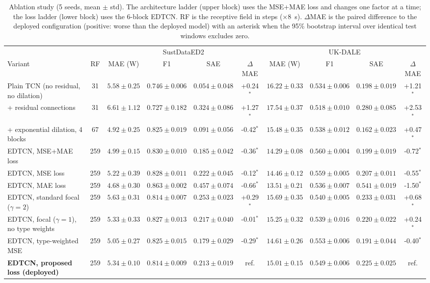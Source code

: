 \documentclass[fleqn,10pt]{wlscirep}
\begin{document}
\begin{table}[!t]
\centering
\caption{Ablation study (5 seeds, mean $\pm$ std). The architecture ladder (upper block) uses the MSE+MAE loss and changes one factor at a time; the loss ladder (lower block) uses the 6-block EDTCN. RF is the receptive field in steps ($\times$8~s). $\Delta$MAE is the paired difference to the deployed configuration (positive: worse than the deployed model) with an asterisk when the 95\% bootstrap interval over identical test windows excludes zero.}
\label{tab:ablation}
\footnotesize
\begin{adjustbox}{max width=\textwidth}\begin{tabular}{@{}lc cccc cccc@{}}
\toprule
 & & \multicolumn{4}{c}{SustDataED2} & \multicolumn{4}{c}{UK-DALE} \\
\cmidrule(lr){3-6}\cmidrule(lr){7-10}
Variant & RF & MAE (W) & F1 & SAE & $\Delta$MAE & MAE (W) & F1 & SAE & $\Delta$MAE \\
\midrule
Plain TCN (no residual, no dilation) & 31 & $5.58\pm0.25$ & $0.746\pm0.006$ & $0.054\pm0.048$ & +0.24$^{*}$ & $16.22\pm0.33$ & $0.534\pm0.006$ & $0.198\pm0.019$ & +1.21$^{*}$ \\
+ residual connections & 31 & $6.61\pm1.12$ & $0.727\pm0.182$ & $0.324\pm0.086$ & +1.27$^{*}$ & $17.54\pm0.37$ & $0.518\pm0.010$ & $0.280\pm0.085$ & +2.53$^{*}$ \\
+ exponential dilation, 4 blocks & 67 & $4.92\pm0.25$ & $0.825\pm0.019$ & $0.091\pm0.056$ & -0.42$^{*}$ & $15.48\pm0.35$ & $0.538\pm0.012$ & $0.162\pm0.023$ & +0.47$^{*}$ \\
\midrule
EDTCN, MSE+MAE loss & 259 & $4.99\pm0.15$ & $0.830\pm0.010$ & $0.185\pm0.042$ & -0.36$^{*}$ & $14.29\pm0.08$ & $0.560\pm0.004$ & $0.199\pm0.019$ & -0.72$^{*}$ \\
EDTCN, MSE loss & 259 & $5.22\pm0.39$ & $0.828\pm0.011$ & $0.222\pm0.045$ & -0.12$^{*}$ & $14.46\pm0.12$ & $0.559\pm0.005$ & $0.207\pm0.011$ & -0.55$^{*}$ \\
EDTCN, MAE loss & 259 & $4.68\pm0.30$ & $0.863\pm0.002$ & $0.457\pm0.074$ & -0.66$^{*}$ & $13.51\pm0.21$ & $0.536\pm0.007$ & $0.541\pm0.019$ & -1.50$^{*}$ \\
EDTCN, standard focal ($\gamma=2$) & 259 & $5.63\pm0.31$ & $0.814\pm0.007$ & $0.253\pm0.023$ & +0.29$^{*}$ & $15.69\pm0.35$ & $0.540\pm0.005$ & $0.233\pm0.031$ & +0.68$^{*}$ \\
EDTCN, focal ($\gamma=1$), no type weights & 259 & $5.33\pm0.33$ & $0.827\pm0.013$ & $0.217\pm0.040$ & -0.01$^{*}$ & $15.25\pm0.32$ & $0.539\pm0.016$ & $0.220\pm0.022$ & +0.24$^{*}$ \\
EDTCN, type-weighted MSE & 259 & $5.05\pm0.27$ & $0.825\pm0.015$ & $0.179\pm0.029$ & -0.29$^{*}$ & $14.61\pm0.26$ & $0.553\pm0.006$ & $0.191\pm0.044$ & -0.40$^{*}$ \\
\textbf{EDTCN, proposed loss (deployed)} & 259 & $5.34\pm0.10$ & $0.814\pm0.009$ & $0.213\pm0.019$ & ref. & $15.01\pm0.15$ & $0.549\pm0.006$ & $0.225\pm0.025$ & ref. \\
\bottomrule
\end{tabular}\end{adjustbox}
\end{table}
\end{document}
